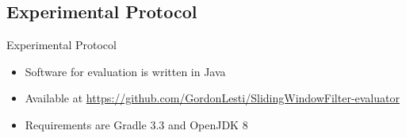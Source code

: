 \subsection{Experimental Protocol}

\begin{frame}{Experimental Protocol}
    \begin{itemize}
        \item Software for evaluation is written in Java
        
        \item Available at \url{https://github.com/GordonLesti/SlidingWindowFilter-evaluator}
        
        \item Requirements are Gradle 3.3 and OpenJDK 8
    \end{itemize}
\end{frame}



